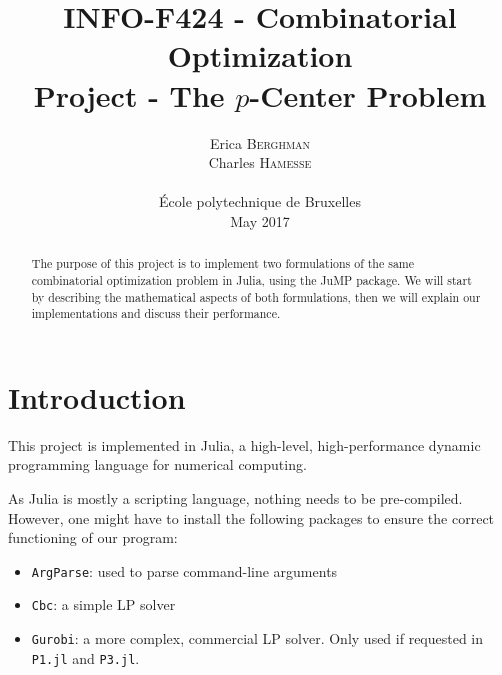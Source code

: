 \documentclass[a4paper,10pt]{article}
\title{INFO-F424 - Combinatorial Optimization\\Project - The $p$-Center Problem}
\date{\vspace{-3ex}
Erica \textsc{Berghman} \\
Charles \textsc{Hamesse} \\
~\\
École polytechnique de Bruxelles\\
\vspace{6ex}May 2017\vspace{4ex}}
\begin{document}

\maketitle
\begin{abstract}
    The purpose of this project is to implement two formulations of the same combinatorial optimization problem in Julia, using the JuMP package. We will start by describing the mathematical aspects of both formulations, then we will explain our implementations and discuss their performance.\vspace{2ex}
\end{abstract}

\tableofcontents
\pagebreak




\section{Introduction}
This project is implemented in Julia, a high-level, high-performance dynamic programming language for numerical computing. 

As Julia is mostly a scripting language, nothing needs to be pre-compiled. However, one might have to install the following packages to ensure the correct functioning of our program:
\begin{itemize}
	\item \texttt{ArgParse}: used to parse command-line arguments
	\item \texttt{Cbc}: a simple LP solver
	\item \texttt{Gurobi}: a more complex, commercial LP solver. Only used if requested in \texttt{P1.jl} and \texttt{P3.jl}.
\end{itemize}
\end{document}
